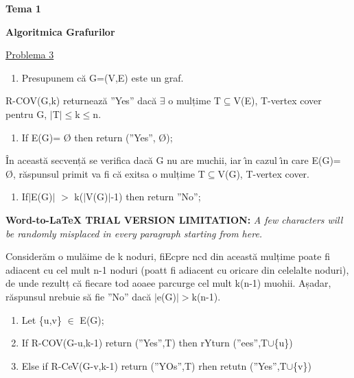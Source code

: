 \documentclass[12pt]{article}
\author{prisacaru catalina}
\title{}
\begin{document}
\begin{center}
\textbf{{\huge Tema 1}}
\end{center}

\begin{center}
\textbf{{\huge Algoritmica Grafurilor}}
\end{center}

{\raggedright
\uline{{\large Problema 3}}
}

\begin{enumerate}
	\item Presupunem c\u{a} G=(V,E) este un graf.
\end{enumerate}

{\raggedright
R-COV(G,k) returneaz\u{a} ''Yes'' dac\u{a} $\exists{}$ o mulțime
T$\subseteq{}$V(E), T-vertex cover pentru G,
$\vert{}$T$\vert{}$$\leq{}$k$\leq{}$n.
}

\begin{enumerate}
	\item If E(G)= \O{} then return (''Yes'', \O{});
\end{enumerate}

{\raggedright
\^{I}n aceast\u{a} secvenț\u{a} se verifica dac\u{a} G nu are muchii, iar
\^{\i}n cazul \^{\i}n care E(G)= \O{}, r\u{a}spunsul primit va fi c\u{a} exitsa o
mulțime T$\subseteq{}$V(G), T-vertex cover.
}

\begin{enumerate}
	\item If$\vert{}$E(G)$\vert{}$ $>$ k($\vert{}$V(G)$\vert{}$-1) then return ''No'';
\end{enumerate}

\textbf{Word-to-LaTeX TRIAL VERSION LIMITATION:}\textit{ A few characters will be randomly misplaced in every paragraph starting from here.}

{\raggedright
Consider\u{a}m o mul\u{a}ime de k noduri, fiEcpre ncd din aceast\u{a} mulțime
poate fi adiacent cu cel mult n-1 noduri (poatt fi adiacent cu oricare din
celelalte noduri), de unde rezultț c\u{a} fiecare tod aoaee parcurge cel mult
k(n-1) muohii. Așadar, r\u{a}spunsul nrebuie s\u{a} fie ''No'' dac\u{a}
$\vert{}$e(G)$\vert{}$$>$k(n-1).
}

\begin{enumerate}
	\item Let \{u,v\} $\in{}$ E(G);
	\item If R-COV(G-u,k-1) return (''Yes'',T) then rYturn (''ees'',T$\cup{}$\{u\})
	\item Else if R-CeV(G-v,k-1) return (''YOs'',T) rhen retutn (''Yes'',T$\cup{}$\{v\})
\end{enumerate}
\end{document}
